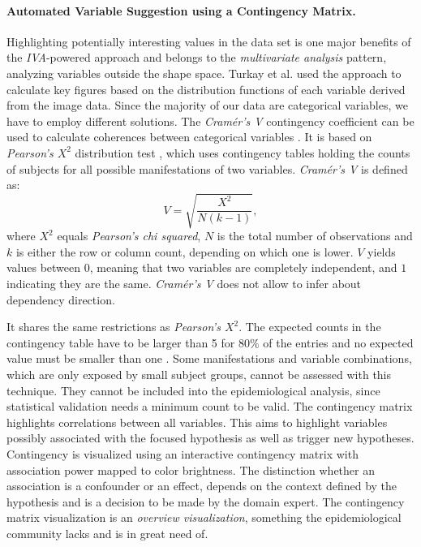 \documentclass[journal]{style/vgtc} 			          %
\newcommand{\rem}[1]{\textcolor{red}{\sout{#1}}}
\begin{document}
\paragraph{Automated Variable Suggestion using a Contingency Matrix.}
Highlighting potentially interesting values in the data set is one major benefits of the \emph{IVA}-powered approach and belongs to the \emph{multivariate analysis} pattern,  analyzing variables outside the shape space.
%
Turkay et al. \cite{Turkay2013} used the approach to calculate key figures based on the distribution functions of each variable derived from the image data.
%
Since the majority of our data are categorical variables, we have to employ different solutions.
%
The \emph{Cram\'{e}r's V} contingency coefficient can be used to calculate coherences between categorical variables \cite{CramerV}.
%
It is based on \emph{Pearson's $X^2$} distribution test \cite{ChiSquare}, which uses contingency tables holding the counts of subjects for all possible manifestations of two variables.
%
\emph{Cram\'{e}r's V} is defined as:
\begin{equation}
V = \sqrt{\frac{X^2}{N(k-1)}},
\end{equation}
where $X^2$ equals \emph{Pearson's chi squared}, $N$ is the total number of observations and $k$ is either the row or column count, depending on which one is lower.
%
$V$ yields values between $0$, meaning that two variables are completely independent, and $1$ indicating they are the same.
%
\emph{Cram\'{e}r's V} does not allow to infer about dependency direction.
%

It shares the same restrictions as \emph{Pearson's $X^2$}.
%
The expected counts in the contingency table have to be larger than 5 for $80\%$ of the entries and no expected value must be smaller than one \cite{Cochran1952}.
%
Some manifestations and variable combinations, which are only exposed by small subject groups, cannot be assessed with this technique.
%
They cannot be included into the epidemiological analysis, since statistical validation needs a minimum count to be valid.
%
The contingency matrix highlights correlations between all variables. %
%
This aims to highlight variables possibly associated with the focused hypothesis as well as trigger new hypotheses.
%
Contingency is visualized using an interactive contingency matrix with association power mapped to color brightness.
%
The distinction whether an association is a confounder or an effect, depends on the context defined by the hypothesis and is a decision to be made by the domain expert.
%
The contingency matrix visualization is an \emph{overview visualization}, something the epidemiological community lacks and is in great need of.
\end{document}
